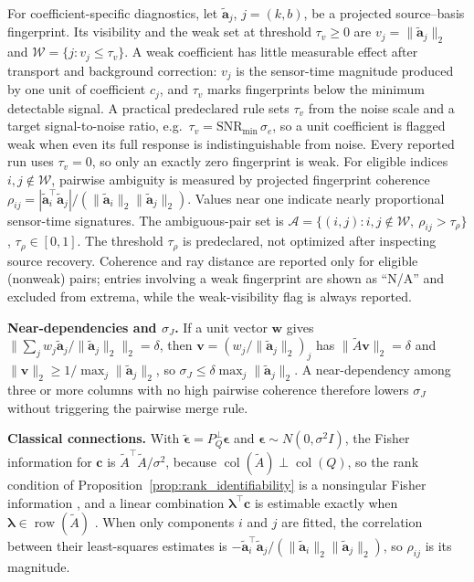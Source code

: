 For coefficient-specific diagnostics, let \(\widetilde{\mathbf a}_j\),
\(j=(k,b)\), be a projected source--basis fingerprint.  Its visibility and the
weak set at threshold \(\tau_v\ge0\) are
\(v_j=\|\widetilde{\mathbf a}_j\|_2\) and
\(\mathcal W=\{j:v_j\le\tau_v\}\).
A weak coefficient has little measurable effect after transport and background
correction: \(v_j\) is the sensor-time magnitude produced by one unit of
coefficient \(c_j\), and \(\tau_v\) marks fingerprints below the minimum
detectable signal.  A practical predeclared rule sets \(\tau_v\) from the noise
scale and a target signal-to-noise ratio, e.g.\ \(\tau_v=\mathrm{SNR}_{\min}\,
\sigma_e\), so a unit coefficient is flagged weak when even its full response is
indistinguishable from noise.  Every reported run uses \(\tau_v=0\), so only an
exactly zero fingerprint is weak.  For eligible indices \(i,j\notin\mathcal W\),
pairwise ambiguity is measured by projected fingerprint coherence
\(\rho_{ij}=|\widetilde{\mathbf a}_i^\top\widetilde{\mathbf a}_j|/
(\|\widetilde{\mathbf a}_i\|_2\|\widetilde{\mathbf a}_j\|_2)\).
Values near one indicate nearly proportional sensor-time signatures.  The
ambiguous-pair set is
\(\mathcal A=\{(i,j):i,j\notin\mathcal W,\ \rho_{ij}>\tau_\rho\}\),
\(\tau_\rho\in[0,1]\).  The threshold \(\tau_\rho\) is predeclared, not optimized after inspecting
source recovery.  Coherence and ray distance are
reported only for eligible (nonweak) pairs; entries involving a weak fingerprint
are shown as ``N/A'' and excluded from extrema, while the weak-visibility flag
is always reported.

\noindent\textbf{Near-dependencies and \(\sigma_J\).}  If a unit vector \(\mathbf w\)
gives \(\|\sum_j w_j\widetilde{\mathbf a}_j/\|\widetilde{\mathbf a}_j\|_2\|_2=\delta\), then
\(\mathbf v=(w_j/\|\widetilde{\mathbf a}_j\|_2)_j\) has \(\|\widetilde A\mathbf v\|_2=\delta\) and
\(\|\mathbf v\|_2\ge1/\max_j\|\widetilde{\mathbf a}_j\|_2\), so
\(\sigma_J\le\delta\max_j\|\widetilde{\mathbf a}_j\|_2\).  A near-dependency among three or
more columns with no high pairwise coherence therefore lowers \(\sigma_J\) without
triggering the pairwise merge rule.

\noindent\textbf{Classical connections.}  With
\(\widetilde{\boldsymbol\epsilon}=P_Q^\perp\boldsymbol\epsilon\) and
\(\boldsymbol\epsilon\sim N(0,\sigma^2I)\), the Fisher information for \(\mathbf c\) is
\(\widetilde A^\top\widetilde A/\sigma^2\), because
\(\operatorname{col}(\widetilde A)\perp\operatorname{col}(Q)\), so the rank condition of
Proposition~\ref{prop:rank_identifiability} is a nonsingular Fisher information
\citep{rothenberg1971identification}, and a linear combination
\(\boldsymbol\lambda^\top\mathbf c\) is estimable exactly when
\(\boldsymbol\lambda\in\operatorname{row}(\widetilde A)\) \citep{searle1971linear}.  When
only components \(i\) and \(j\) are fitted, the correlation between their least-squares
estimates is \(-\widetilde{\mathbf a}_i^\top\widetilde{\mathbf a}_j/
(\|\widetilde{\mathbf a}_i\|_2\|\widetilde{\mathbf a}_j\|_2)\), so \(\rho_{ij}\) is its
magnitude.

